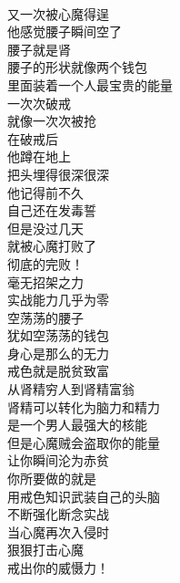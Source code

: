 \begin{poem}[空荡荡的腰子]
    \begin{multicols}{3}
        \centering~\\
        又一次被心魔得逞 \\ 他感觉腰子瞬间空了 \\ 腰子就是肾 \\ 腰子的形状就像两个钱包 \\ 里面装着一个人最宝贵的能量 \\ 一次次破戒 \\ 就像一次次被抢 \\ 在破戒后 \\ 他蹲在地上 \\ 把头埋得很深很深 \\ 他记得前不久 \\ 自己还在发毒誓 \\ 但是没过几天 \\ 就被心魔打败了 \\ 彻底的完败！ \\ 毫无招架之力 \\ 实战能力几乎为零 \\ 空荡荡的腰子 \\ 犹如空荡荡的钱包 \\ 身心是那么的无力 \\ 戒色就是脱贫致富 \\ 从肾精穷人到肾精富翁 \\ 肾精可以转化为脑力和精力 \\ 是一个男人最强大的核能 \\ 但是心魔贼会盗取你的能量 \\ 让你瞬间沦为赤贫 \\ 你所要做的就是 \\ 用戒色知识武装自己的头脑 \\ 不断强化断念实战 \\ 当心魔再次入侵时 \\ 狠狠打击心魔 \\ 戒出你的威慑力！
    \end{multicols}
\end{poem}

